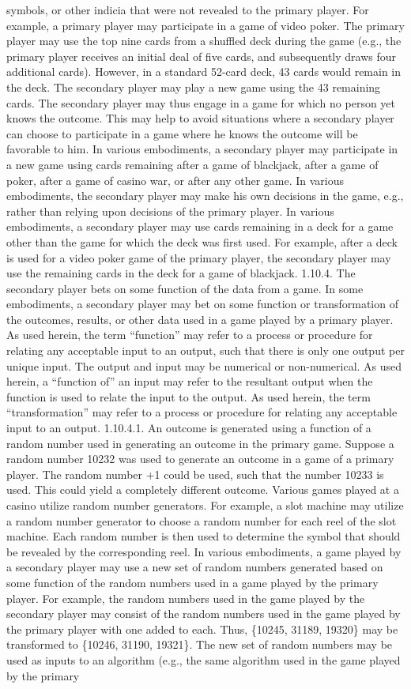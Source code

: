 \documentclass[11pt,a4paper]{article}
\begin{document}
symbols, or other indicia that were not revealed to the primary player. For example, a primary player may participate in a game of video poker. The primary player may use the top nine cards from a shuffled deck during the game (e.g., the primary player receives an initial deal of five cards, and subsequently draws four additional cards). However, in a standard 52-card deck, 43 cards would remain in the deck. The secondary player may play a new game using the 43 remaining cards. The secondary player may thus engage in a game for which no person yet knows the outcome. This may help to avoid situations where a secondary player can choose to participate in a game where he knows the outcome will be favorable to him. In various embodiments, a secondary player may participate in a new game using cards remaining after a game of blackjack, after a game of poker, after a game of casino war, or after any other game. In various embodiments, the secondary player may make his own decisions in the game, e.g., rather than relying upon decisions of the primary player. In various embodiments, a secondary player may use cards remaining in a deck for a game other than the game for which the deck was first used. For example, after a deck is used for a video poker game of the primary player, the secondary player may use the remaining cards in the deck for a game of blackjack. 1.10.4. The secondary player bets on some function of the data from a game. In some embodiments, a secondary player may bet on some function or transformation of the outcomes, results, or other data used in a game played by a primary player. As used herein, the term “function” may refer to a process or procedure for relating any acceptable input to an output, such that there is only one output per unique input. The output and input may be numerical or non-numerical. As used herein, a “function of” an input may refer to the resultant output when the function is used to relate the input to the output. As used herein, the term “transformation” may refer to a process or procedure for relating any acceptable input to an output. 1.10.4.1. An outcome is generated using a function of a random number used in generating an outcome in the primary game. Suppose a random number 10232 was used to generate an outcome in a game of a primary player. The random number +1 could be used, such that the number 10233 is used. This could yield a completely different outcome. Various games played at a casino utilize random number generators. For example, a slot machine may utilize a random number generator to choose a random number for each reel of the slot machine. Each random number is then used to determine the symbol that should be revealed by the corresponding reel. In various embodiments, a game played by a secondary player may use a new set of random numbers generated based on some function of the random numbers used in a game played by the primary player. For example, the random numbers used in the game played by the secondary player may consist of the random numbers used in the game played by the primary player with one added to each. Thus, \{10245, 31189, 19320\} may be transformed to \{10246, 31190, 19321\}. The new set of random numbers may be used as inputs to an algorithm (e.g., the same algorithm used in the game played by the primary 
\end{document}
